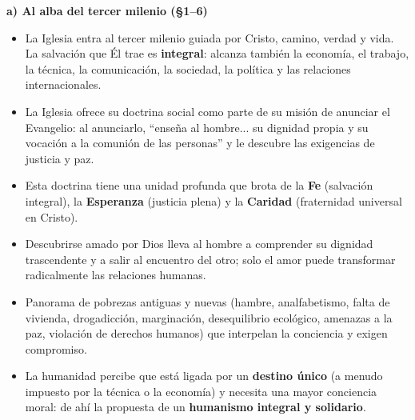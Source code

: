 \documentclass[10pt,a4paper]{article}
\begin{document}
\medskip\noindent \textbf{a) Al alba del tercer milenio (\S{}1--6)}\par\nopagebreak
\begin{itemize}
\item La Iglesia entra al tercer milenio guiada por Cristo, camino, verdad y vida. La salvación que Él trae es \textbf{integral}: alcanza también la economía, el trabajo, la técnica, la comunicación, la sociedad, la política y las relaciones internacionales.
\item La Iglesia ofrece su doctrina social como parte de su misión de anunciar el Evangelio: al anunciarlo, ``enseña al hombre... su dignidad propia y su vocación a la comunión de las personas'' y le descubre las exigencias de justicia y paz.
\item Esta doctrina tiene una unidad profunda que brota de la \textbf{Fe} (salvación integral), la \textbf{Esperanza} (justicia plena) y la \textbf{Caridad} (fraternidad universal en Cristo).
\item Descubrirse amado por Dios lleva al hombre a comprender su dignidad trascendente y a salir al encuentro del otro; solo el amor puede transformar radicalmente las relaciones humanas.
\item Panorama de pobrezas antiguas y nuevas (hambre, analfabetismo, falta de vivienda, drogadicción, marginación, desequilibrio ecológico, amenazas a la paz, violación de derechos humanos) que interpelan la conciencia y exigen compromiso.
\item La humanidad percibe que está ligada por un \textbf{destino único} (a menudo impuesto por la técnica o la economía) y necesita una mayor conciencia moral: de ahí la propuesta de un \textbf{humanismo integral y solidario}.
\end{itemize}
\end{document}
